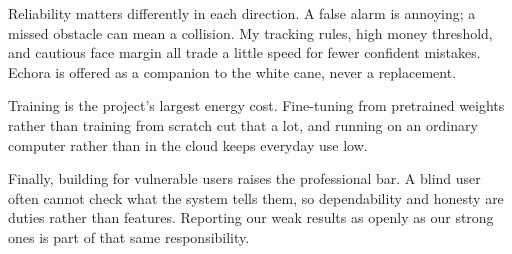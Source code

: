 \documentclass[12pt,a4paper]{report}
\begin{document}
Reliability matters differently in each direction. A false alarm is annoying; a
missed obstacle can mean a collision. My tracking rules, high money threshold,
and cautious face margin all trade a little speed for fewer confident mistakes.
Echora is offered as a companion to the white cane, never a replacement.

Training is the project's largest energy cost. Fine-tuning from pretrained
weights rather than training from scratch cut that a lot, and running on an
ordinary computer rather than in the cloud keeps everyday use low.

Finally, building for vulnerable users raises the professional bar. A blind user
often cannot check what the system tells them, so dependability and honesty are
duties rather than features. Reporting our weak results as openly as our strong
ones is part of that same responsibility.
\end{document}
